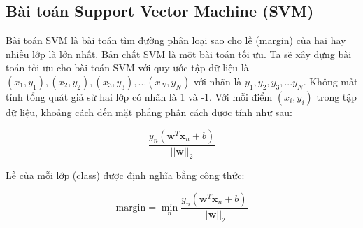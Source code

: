 \documentclass[a4paper, 12pt, oneside]{report}
\begin{document}
\subsection{Bài toán Support Vector Machine (SVM)}
Bài toán SVM là bài toán tìm đường phân loại sao cho lề (margin) của hai hay nhiều lớp là lớn nhất. Bản chất SVM là một bài toán tối ưu. Ta sẽ xây dựng bài toán tối ưu cho bài toán SVM với quy ước tập dữ liệu là $(x_1,y_1),(x_2,y_2),(x_3,y_3),...(x_N,y_N)$ với nhãn là $y_1,y_2,y_3,...y_N$. Không mất tính tổng quát giả sử hai lớp có nhãn là 1 và -1. Với mỗi điểm $(x_i,y_i)$ trong tập dữ liệu, khoảng cách đến mặt phẳng phân cách được tính như sau:\\

\begin{mybox}
$$\frac{y_n(\mathbf{w}^T\mathbf{x}_n + b)}{||\mathbf{w}||_2}$$ \end{mybox}
Lề của mỗi lớp (class) được định nghĩa bằng công thức:
\begin{mybox}
$$\text{margin} = \min_{n} \frac{y_n(\mathbf{w}^T\mathbf{x}_n + b)}{||\mathbf{w}||_2}$$ 
\end{mybox}
\bigskip
\end{document}
